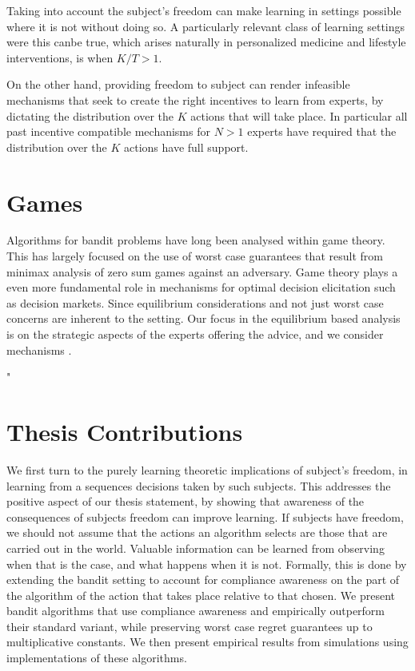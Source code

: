 Taking into account the subject's freedom can make learning in settings possible where it is not without doing so.
A particularly relevant class of learning settings were this canbe true, which arises naturally in personalized medicine and lifestyle interventions, is when $K/T > 1$.

On the other hand, providing freedom to subject can render infeasible mechanisms that seek to create the right incentives to learn from experts, by dictating the distribution over the $K$ actions that will take place.
In particular all past incentive compatible mechanisms for $N>1$ experts have required that the distribution over the $K$ actions have full support.


\section{Games}

Algorithms for bandit problems have long been analysed within game theory.
This has largely focused on the use of worst case guarantees that result from minimax analysis of zero sum games against an adversary.
Game theory plays a even more fundamental role in mechanisms for optimal decision elicitation such as decision markets.
Since equilibrium considerations and not just worst case concerns are inherent to the setting.
Our focus in the equilibrium based analysis is on the strategic aspects of the experts offering the advice, and we consider mechanisms .


"%

\section{Thesis Contributions}

We first turn to the purely learning theoretic implications of subject's freedom, in learning from a sequences decisions taken by such subjects.
This addresses the positive aspect of our thesis statement, by showing that awareness of the consequences of subjects freedom can improve learning.
If subjects have freedom, we should not assume that the actions an algorithm selects are those that are carried out in the world.
Valuable information can be learned from observing when that is the case, and what happens when it is not.
Formally, this is done by extending the bandit setting to account for compliance awareness on the part of the algorithm of the action that takes place relative to that chosen.
We present bandit algorithms that use compliance awareness and empirically outperform their standard variant, while preserving worst case regret guarantees up to multiplicative constants.
We then present empirical results from simulations using implementations of these algorithms.

